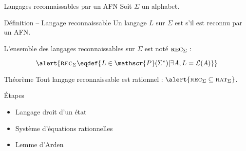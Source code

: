 
\begingroup

\begin{frame}{Langages reconnaissables par un AFN}
  Soit $\Sigma$ un alphabet.
  \begin{block}{Définition -- Langage reconnaissable}
    Un langage $L$ sur $\Sigma$ est  s'il est reconnu par un AFN. 

    L'ensemble des langages reconnaissables sur $\Sigma$ est noté \alert{$\textsc{rec}_\Sigma$} :

    \vspace{-2mm}
    $$\alert{\textsc{rec}_\Sigma \eqdef \{ L \in \mathscr{P}(\Sigma^\star) | \exists A, L = \mathcal{L}(A)\}} $$

  \end{block}
  
  \vspace{-3mm}
  \begin{alertblock}{Théorème}
    Tout langage reconnaissable est rationnel : $\alert{\textsc{rec}_\Sigma \subseteq \textsc{rat}_\Sigma}$.
  \end{alertblock}

  \begin{center}
  \end{center}
  
  \vspace{-3mm}
  \begin{block}{Étapes}
    \begin{itemize}
    \item \vspace{-3mm} Langage droit d'un état
    \item Système d'équations rationnelles
    \item Lemme d'Arden
    \end{itemize}
  \end{block}
\end{frame}

\endgroup
